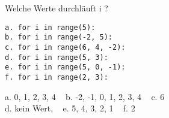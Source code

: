 \question[3] Welche Werte durchläuft i ? 
\begin{lstlisting}
a. for i in range(5):
b. for i in range(-2, 5):
c. for i in range(6, 4, -2):
d. for i in range(5, 3):
e. for i in range(5, 0, -1):
f. for i in range(2, 3):
\end{lstlisting}
\begin{solutionbox}{3cm}
a. 0, 1, 2, 3, 4 ~ b. -2, -1, 0, 1, 2, 3, 4 ~ c. 6   \\
d. kein Wert, ~ e. 5, 4, 3, 2, 1 ~ f. 2
\end{solutionbox}
